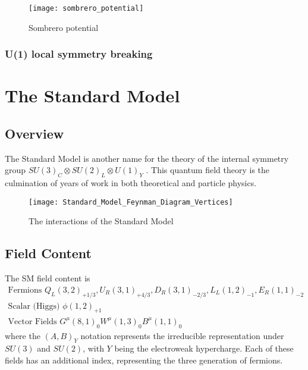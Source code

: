 \begin{figure} \label{fig:sombrero}
\caption{Sombrero potential}
\texttt{[image: sombrero\_potential]}
\end{figure}

\subsubsection{U(1) local  symmetry breaking}

\section{The Standard Model}

\subsection{Overview}

The Standard Model is another name for the theory of the internal symmetry group $SU(3)_C \otimes SU(2)_L \otimes U(1)_Y$ .
This quantum field theory is the culmination of years of work in both theoretical and particle physics.  

\begin{figure}
\caption{The interactions of the Standard Model}
\texttt{[image: Standard\_Model\_Feynman\_Diagram\_Vertices]}
\end{figure}

\subsection{Field Content}

The SM field content is
\begin{equation}
\begin{aligned}
\text{Fermions } Q_L(3,2)_{+1/3}, \xspace  U_R(3,1)_{+4/3},\xspace  D_R(3,1)_{-2/3} ,\xspace  L_L(1,2)_{-1} ,\xspace  E_R(1,1)_{-2}\\
\text{Scalar (Higgs) } \xspace \phi(1,2)_{+1} \\
\text{Vector Fields } \xspace G^\mu(8,1)_0 \xspace W^\mu(1,3)_0  \xspace B^\mu(1,1)_0
\end{aligned}
\end{equation}
where the $(A, B)_Y$ notation represents the irreducible representation under $SU(3)$ and $SU(2)$, with $Y$ being the electroweak hypercharge.
Each of these fields has an additional index, representing the three generation of fermions.

